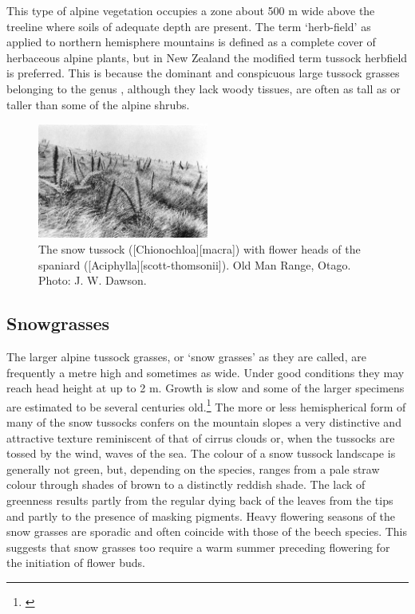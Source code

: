 This type of alpine vegetation occupies a zone about 500 m wide above the treeline where soils of adequate depth are present.
The term `herb-field' as applied to northern hemisphere mountains is defined as a complete cover of herbaceous alpine plants, but in New Zealand the modified term tussock herbfield is preferred.
This is because the dominant and conspicuous large tussock grasses belonging to the genus , although they lack woody tissues, are often as tall as or taller than some of the alpine shrubs.

\begin{figure}
	\includegraphics[width=0.5\textwidth]{graphics/figure96snow-tussock.jpg}
	\centering
	\caption[Snow tussock]{The snow tussock ([Chionochloa][macra]) with flower heads of the spaniard ([Aciphylla][scott-thomsonii]).
	Old Man Range, Otago.
	Photo: J. W. Dawson.}%
	\label{fig:96snow-tussock}
\end{figure}

\subsection{Snowgrasses}

The larger alpine tussock grasses, or `snow grasses' as they are called, are frequently a metre high and sometimes as wide.
Under good conditions they may reach head height at up to 2 m.
Growth is slow and some of the larger specimens are estimated to be several centuries old.\footnote{\cite{mark1974snow}}
The more or less hemispherical form of many of the snow tussocks confers on the mountain slopes a very distinctive and attractive texture reminiscent of that of cirrus clouds or, when the tussocks are tossed by the wind, waves of the sea.
The colour of a snow tussock landscape is generally not green, but, depending on the species, ranges from a pale straw colour through shades of brown to a distinctly reddish shade.
The lack of greenness results partly from the regular dying back of the leaves from the tips and partly to the presence of masking pigments.
Heavy flowering seasons of the snow grasses are sporadic and often coincide with those of the beech species.
This suggests that snow grasses too require a warm summer preceding flowering for the initiation of flower buds.

